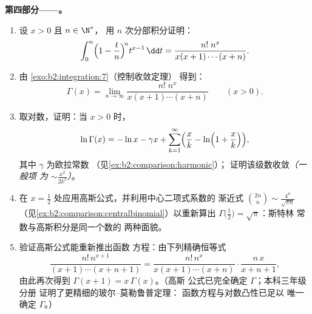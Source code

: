 \begin{problem}
\medskip
\noindent\textbf{第四部分——。}
\begin{enumerate}[resume]
  \item 设 $x > 0$ 且 $n \in \N^*$，
        用 $n$ 次分部积分证明：
        \[
        \int_0^n \Bigl(1 - \frac tn\Bigr)^{\!n} t^{x-1}\,\dd t
        = \frac{n!\;n^x}{x(x+1)\cdots(x+n)} .
        \]
  \item 由 \cref{exo:b2:integration:7}（控制收敛定理）
        得到\emph{}：
        \[
        \Gamma(x) = \lim_{n\to\infty}
        \frac{n!\;n^x}{x(x+1)\cdots(x+n)}
        \qquad (x > 0).
        \]
  \item 取对数，证明：当 $x > 0$ 时，
        \[
        \ln\Gamma(x) = -\ln x - \gamma x +
        \sum_{k=1}^{\infty}\Bigl(\frac xk -
        \ln\Bigl(1 + \frac xk\Bigr)\Bigr),
        \]
        其中 $\gamma$ 为欧拉常数
        （见\cref{ex:b2:comparison:harmonic}）；
        证明该级数收敛\emph{（一般项
        为 $\sim \frac{x^2}{2k^2}$）}。
  \item 在 $x = \frac12$ 处应用高斯公式，并利用中心二项式系数的
        渐近式 $\binom{2n}{n} \sim
        \frac{4^n}{\sqrt{\pi n}}$
        （见\cref{ex:b2:comparison:centralbinomial}）以重新算出
        $\Gamma\bigl(\frac12\bigr) = \sqrt\pi$：斯特林
        常数与高斯积分是同一个数的
        两种面貌。
  \item 验证高斯公式能重新推出函数
        方程：由下列精确恒等式
        \[
        \frac{n!\,n^{x+1}}{(x+1)\cdots(x+n+1)}
        = \frac{n!\,n^{x}}{x(x+1)\cdots(x+n)}\cdot
        \frac{n\,x}{x+n+1},
        \]
        由此再次得到 $\Gamma(x+1) = x\,\Gamma(x)$。（高斯
        公式已完全确定 $\Gamma$；本科三年级分册
        证明了更精细的玻尔–莫勒鲁普定理：
        函数方程与对数凸性已足以
        唯一确定 $\Gamma$。）
\end{enumerate}


\end{problem}
